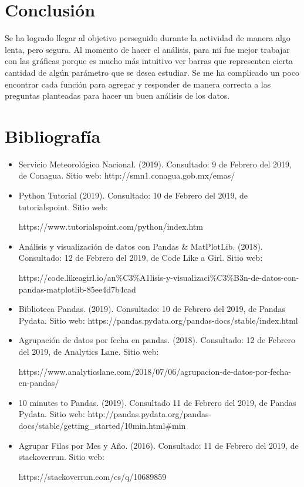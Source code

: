 \documentclass{article}
\begin{document}
\section{Conclusión}

Se ha logrado llegar al objetivo perseguido durante la actividad de manera algo lenta, pero segura. Al momento de hacer el análisis, para mí fue mejor trabajar con las gráficas porque es mucho más intuitivo ver barras que representen cierta cantidad de algún parámetro que se desea estudiar. Se me ha complicado un poco encontrar cada función para agregar y responder de manera correcta a las preguntas planteadas para hacer un buen análisis de los datos.

\clearpage

\section{Bibliografía}
\begin{itemize}

    \item Servicio Meteorológico Nacional. (2019). Consultado: 9 de Febrero del 2019, de Conagua. Sitio web: http://smn1.conagua.gob.mx/emas/
    
    \item Python Tutorial (2019). Consultado: 10 de Febrero del 2019, de tutorialspoint. Sitio web:
    
    https://www.tutorialspoint.com/python/index.htm
    
    \item Análisis y visualización de datos con Pandas \& MatPlotLib. (2018). Consultado: 12 de Febrero del 2019, de Code Like a Girl. Sitio web:
    
    https://code.likeagirl.io/an\%C3\%A1lisis-y-visualizaci\%C3\%B3n-de-datos-con-pandas-matplotlib-85ee4d7b4cad
    
    \item Biblioteca Pandas. (2019). Consultado: 10 de Febrero del 2019, de Pandas Pydata. Sitio web: https://pandas.pydata.org/pandas-docs/stable/index.html
    
    \item Agrupación de datos por fecha en pandas. (2018). Consultado: 12 de Febrero del 2019, de Analytics Lane. Sitio web:
    
    https://www.analyticslane.com/2018/07/06/agrupacion-de-datos-por-fecha-en-pandas/
    
    \item 10 minutes to Pandas. (2019). Consultado 11 de Febrero del 2019, de Pandas Pydata. Sitio web: http://pandas.pydata.org/pandas-docs/stable/getting\_started/10min.html\#min
    
    \item Agrupar Filas por Mes y Año. (2016). Consultado: 11 de Febrero del 2019, de stackoverrun. Sitio web:
    
    https://stackoverrun.com/es/q/10689859
\end{itemize}
\end{document}
